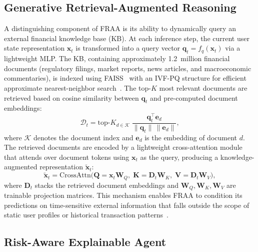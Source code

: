 \documentclass[10pt,twocolumn]{article}
\begin{document}
\subsection{Generative Retrieval-Augmented Reasoning}
\label{sec:retrieval}

A distinguishing component of FRAA is its ability to dynamically query an external financial knowledge base (KB).
At each inference step, the current user state representation $\mathbf{x}_t$ is transformed into a query vector $\mathbf{q}_t = f_q(\mathbf{x}_t)$ via a lightweight MLP.
The KB, containing approximately 1.2~million financial documents (regulatory filings, market reports, news articles, and macroeconomic commentaries), is indexed using FAISS~\cite{johnson2019billion} with an IVF-PQ structure for efficient approximate nearest-neighbor search~\cite{arxiv-2511.13526,arxiv-2510.15552,arxiv-2512.06296}.
The top-$K$ most relevant documents are retrieved based on cosine similarity between $\mathbf{q}_t$ and pre-computed document embeddings:
\begin{equation}
\mathcal{D}_t = \text{top-}K_{d \in \mathcal{K}} \; \frac{\mathbf{q}_t^{\top} \mathbf{e}_d}{\|\mathbf{q}_t\| \, \|\mathbf{e}_d\|},
\label{eq:retrieval}
\end{equation}
where $\mathcal{K}$ denotes the document index and $\mathbf{e}_d$ is the embedding of document $d$.
The retrieved documents are encoded by a lightweight cross-attention module that attends over document tokens using $\mathbf{x}_t$ as the query, producing a knowledge-augmented representation $\tilde{\mathbf{x}}_t$:
\begin{equation}
\tilde{\mathbf{x}}_t = \text{CrossAttn}\bigl(\mathbf{Q}\!=\!\mathbf{x}_t\mathbf{W}_Q,\; \mathbf{K}\!=\!\mathbf{D}_t\mathbf{W}_K,\; \mathbf{V}\!=\!\mathbf{D}_t\mathbf{W}_V\bigr),
\label{eq:crossattn}
\end{equation}
where $\mathbf{D}_t$ stacks the retrieved document embeddings and $\mathbf{W}_Q, \mathbf{W}_K, \mathbf{W}_V$ are trainable projection matrices.
This mechanism enables FRAA to condition its predictions on time-sensitive external information that falls outside the scope of static user profiles or historical transaction patterns~\cite{arxiv-2511.11132,arxiv-2511.00879}.

\subsection{Risk-Aware Explainable Agent}
\label{sec:agent}
\end{document}
